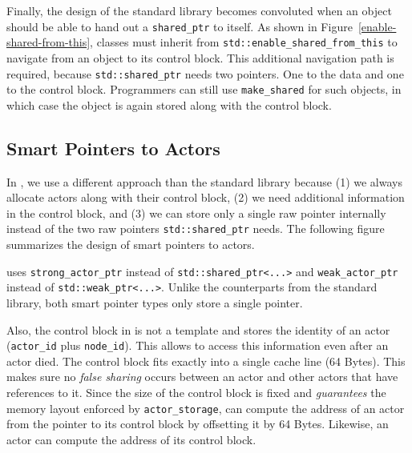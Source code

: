 
Finally, the design of the standard library becomes convoluted when an object should be able to hand out a \lstinline^shared_ptr^ to itself. As shown in Figure~\ref{enable-shared-from-this}, classes must inherit from \lstinline^std::enable_shared_from_this^ to navigate from an object to its control block. This additional navigation path is required, because \lstinline^std::shared_ptr^ needs two pointers. One to the data and one to the control block. Programmers can still use \lstinline^make_shared^ for such objects, in which case the object is again stored along with the control block.

\subsection{Smart Pointers to Actors}

In \lib, we use a different approach than the standard library because (1) we always allocate actors along with their control block, (2) we need additional information in the control block, and (3) we can store only a single raw pointer internally instead of the two raw pointers \lstinline^std::shared_ptr^ needs. The following figure summarizes the design of smart pointers to actors.



\lib uses \lstinline^strong_actor_ptr^ instead of \lstinline^std::shared_ptr<...>^ and \lstinline^weak_actor_ptr^ instead of \lstinline^std::weak_ptr<...>^. Unlike the counterparts from the standard library, both smart pointer types only store a single pointer.

Also, the control block in \lib is not a template and stores the identity of an actor (\lstinline^actor_id^ plus \lstinline^node_id^). This allows \lib to access this information even after an actor died. The control block fits exactly into a single cache line (64 Bytes). This makes sure no \emph{false sharing} occurs between an actor and other actors that have references to it. Since the size of the control block is fixed and \lib \emph{guarantees} the memory layout enforced by \lstinline^actor_storage^, \lib can compute the address of an actor from the pointer to its control block by offsetting it by 64 Bytes. Likewise, an actor can compute the address of its control block.

